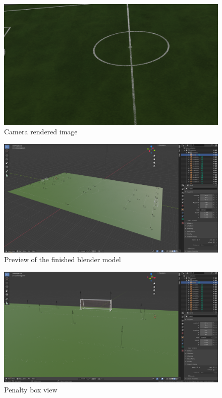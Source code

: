 \documentclass[
    11pt,
    twoside
]{report}
\begin{document}
\begin{appendices}
\begin{figure}[H]
    \includegraphics[keepaspectratio, width=\columnwidth]{image.png}
    \caption{Camera rendered image}
    \label{img:camera_view}
\end{figure}


\begin{figure}[H]
    \includegraphics[keepaspectratio, width=\columnwidth]{Screenshot_2022-03-05_12-03-42.png}
    \caption{Preview of the finished blender model}
    \label{img:blender_preview}
\end{figure}


\begin{figure}[H]
    \includegraphics[keepaspectratio, width=\columnwidth]{Screenshot_2022-03-05_12-45-59.png}
    \caption{Penalty box view}
    \label{img:penalty_box}
\end{figure}



\end{appendices}
\end{document}

